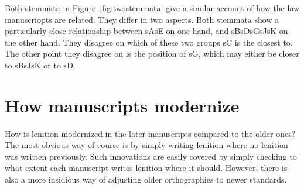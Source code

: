 Both stemmata in Figure~\ref{fig:twostemmata} give a similar account of how the law manuscriopts are related. They differ in two aspects. Both stemmata show a particularly close relationship between \gls{sA}\gls{sE} on one hand, and \gls{sB}\gls{sD}\gls{sG}\gls{sJ}\gls{sK} on the other hand. They disagree on which of these two groups \gls{sC} is the closest to. The other point they disagree on is the position of \gls{sG}, which may either be closer to \gls{sB}\gls{sJ}\gls{sK} or to \gls{sD}.
  


\section{How manuscripts modernize}
\label{sec:how-do-manuscripts}

How is lenition modernized in the later manuscripts compared to the older ones?
The most obvious way of course is by simply writing lenition where no lenition was written previously. Such innovations are easily covered by simply checking to what extent each manuscript writes lenition where it should. However, there is also a more insidious way of adjusting older orthographies to newer standards.

